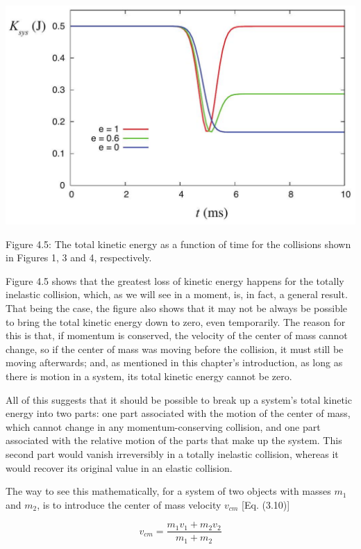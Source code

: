 \documentclass[10pt]{article}
\begin{document}
\begin{center}
\includegraphics[max width=\textwidth]{2024_09_14_9969b06773f10b6936e8g-094}
\end{center}

Figure 4.5: The total kinetic energy as a function of time for the collisions shown in Figures 1, 3 and 4, respectively.

Figure 4.5 shows that the greatest loss of kinetic energy happens for the totally inelastic collision, which, as we will see in a moment, is, in fact, a general result. That being the case, the figure also shows that it may not be always be possible to bring the total kinetic energy down to zero, even temporarily. The reason for this is that, if momentum is conserved, the velocity of the center of mass cannot change, so if the center of mass was moving before the collision, it must still be moving afterwards; and, as mentioned in this chapter's introduction, as long as there is motion in a system, its total kinetic energy cannot be zero.

All of this suggests that it should be possible to break up a system's total kinetic energy into two parts: one part associated with the motion of the center of mass, which cannot change in any momentum-conserving collision, and one part associated with the relative motion of the parts that make up the system. This second part would vanish irreversibly in a totally inelastic collision, whereas it would recover its original value in an elastic collision.

The way to see this mathematically, for a system of two objects with masses $m_{1}$ and $m_{2}$, is to introduce the center of mass velocity $v_{c m}$ [Eq. (3.10)]

$$
v_{c m}=\frac{m_{1} v_{1}+m_{2} v_{2}}{m_{1}+m_{2}}
$$
\end{document}
